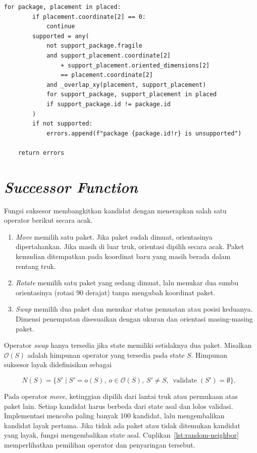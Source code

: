 \begin{lstlisting}[caption={Validasi batas ruang, tabrakan, kapasitas, dan dukungan},label={lst:state-validation}]
    for package, placement in placed:
        if placement.coordinate[2] == 0:
            continue
        supported = any(
            not support_package.fragile
            and support_placement.coordinate[2]
                + support_placement.oriented_dimensions[2]
                == placement.coordinate[2]
            and _overlap_xy(placement, support_placement)
            for support_package, support_placement in placed
            if support_package.id != package.id
        )
        if not supported:
            errors.append(f"package {package.id!r} is unsupported")

    return errors
\end{lstlisting}

\section{\textit{Successor Function}}

Fungsi suksesor membangkitkan kandidat dengan menerapkan salah satu operator berikut secara acak. 

\begin{enumerate}
    \renewcommand{\labelenumi}{(\arabic{enumi})}
    \item \textit{Move} memilih satu paket. Jika paket sudah dimuat, orientasinya dipertahankan. Jika masih di luar truk, orientasi dipilih secara acak. Paket kemudian ditempatkan pada koordinat baru yang masih berada dalam rentang truk.
    \item \textit{Rotate} memilih satu paket yang sedang dimuat, lalu menukar dua sumbu orientasinya (rotasi 90 derajat) tanpa mengubah koordinat paket.
    \item \textit{Swap} memilih dua paket dan menukar status pemuatan atau posisi keduanya. Dimensi penempatan disesuaikan dengan ukuran dan orientasi masing-masing paket.
\end{enumerate}

Operator \textit{swap} hanya tersedia jika state memiliki setidaknya dua paket. Misalkan $\mathcal{O}(S)$ adalah himpunan operator yang tersedia pada state $S$. Himpunan suksesor layak didefinisikan sebagai

\begin{equation}
    N(S)=\{S'\mid S'=o(S),\ o\in\mathcal{O}(S),\ S'\neq S,\ \operatorname{validate}(S')=\emptyset\}.
    \label{eq:successor-function}
\end{equation}

Pada operator \textit{move}, ketinggian dipilih dari lantai truk atau permukaan atas paket lain. Setiap kandidat harus berbeda dari state asal dan lolos validasi. Implementasi mencoba paling banyak 100 kandidat, lalu mengembalikan kandidat layak pertama. Jika tidak ada paket atau tidak ditemukan kandidat yang layak, fungsi mengembalikan state asal. Cuplikan~\ref{lst:random-neighbor} memperlihatkan pemilihan operator dan penyaringan tersebut.

